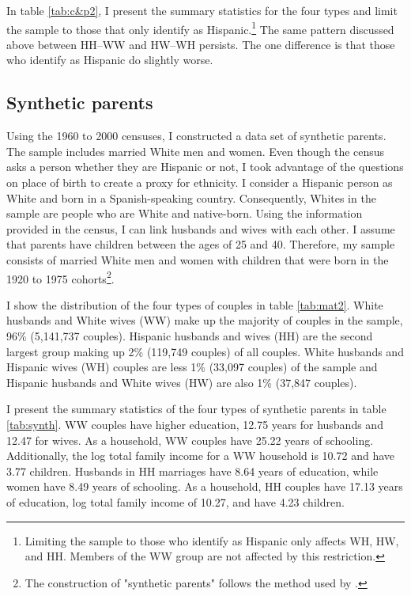 \documentclass[12pt,english]{article}
\begin{document}
In table \ref{tab:c&p2}, I present the summary statistics for the four types and limit the sample to those that only identify as Hispanic.\footnote{Limiting the sample to those who identify as Hispanic only affects WH, HW, and HH. Members of the WW group are not affected by this restriction.} The same pattern discussed above between HH--WW and HW--WH persists. The one difference is that those who identify as Hispanic do slightly worse.
 
\subsection{Synthetic parents}

Using the 1960 to 2000 censuses, I constructed a data set of synthetic parents. The sample includes married White men and women. Even though the census asks a person whether they are Hispanic or not, I took advantage of the questions on place of birth to create a proxy for ethnicity. I consider a Hispanic person as White and born in a Spanish-speaking country. Consequently, Whites in the sample are people who are White and native-born. Using the information provided in the census, I can link husbands and wives with each other. I assume that parents have children between the ages of 25 and 40. Therefore, my sample consists of married White men and women with children that were born in the 1920 to 1975 cohorts\footnote{The construction of "synthetic parents" follows the method used by \textcite{rubinstein2014pride}.}.

I show the distribution of the four types of couples in table \ref{tab:mat2}. White husbands and White wives (WW) make up the majority of couples in the sample, 96\% (5,141,737 couples). Hispanic husbands and wives (HH) are the second largest group making up 2\% (119,749 couples) of all couples. White husbands and Hispanic wives (WH) couples are less 1\% (33,097 couples) of the sample and Hispanic husbands and White wives (HW) are also 1\% (37,847 couples). 


I present the summary statistics of the four types of synthetic parents in table \ref{tab:synth}. WW couples have higher education, 12.75 years for husbands and 12.47 for wives. As a household, WW couples have 25.22 years of schooling. Additionally, the log total family income for a WW household is 10.72 and have 3.77 children. Husbands in HH marriages have 8.64 years of education, while women have 8.49 years of schooling. As a household, HH couples have 17.13 years of education, log total family income of 10.27, and have 4.23 children.
\end{document}
